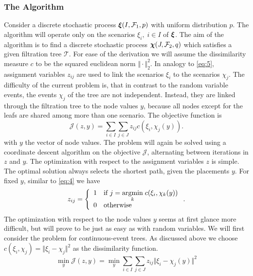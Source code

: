 \subsubsection{The Algorithm}
\label{sec:k-means-for-trees-alg}
Consider a discrete stochastic process $\boldsymbol\xi(I, \mathcal{F}_1, p)$ with uniform distribution $p$.
The algorithm will operate only on the scenarios $\xi_i,\; i\in I$ of $\boldsymbol\xi$.
The aim of the algorithm is to find a discrete stochastic process $\boldsymbol\chi(J, \mathcal{F}_2,q)$ which satisfies a given filtration tree $\mathcal{T}$.
For ease of the derivation we will assume the dissimilarity measure $c$ to be the squared euclidean norm $\Vert\cdot\Vert_2^2$.
In analogy to \eqref{eq:5}, assignment variables $z_{ij}$ are used to link the scenarios $\xi_i$ to the scenarios $\chi_j$.
The difficulty of the current problem is, that in contrast to the random variable events, the events $\chi_j$ of the tree are not independent.
Instead, they are linked through the filtration tree to the node values $y$, because all nodes except for the leafs are shared among more than one scenario.
The objective function is
\begin{equation}
  \label{eq:8}
  \mathcal{J}(z, y) = \sum_{i\in I}\sum_{j\in J}z_{ij}c(\xi_i, \chi_j(y)).
\end{equation}
with $y$ the vector of  node values.
The problem will again be solved using a coordinate descent algorithm on the objective $\mathcal{J}$, alternating between iterations in $z$ and $y$.
The optimization with respect to the assignment variables $z$ is simple.
The optimal solution always selects the shortest path, given the placements $y$.
For fixed $y$, similar to \eqref{eq:4} we have
\begin{equation}
  \label{eq:10}
  z_{ij} = \left\{\begin{array}{ll}1&\text{if }j=\underset{k}{\operatorname{argmin}}\; c(\xi_i,\chi_k(y))\\0&\text{otherwise} \end{array}\right. .
\end{equation}
The optimization with respect to the node values $y$ seems at first glance more difficult, but will prove to be just as easy as with random variables.
We will first consider the problem for continuous-event trees.
As discussed above we choose $c(\xi_i, \chi_j) = \Vert \xi_i-\chi_j\Vert^2$ as the dissimilarity function.
\begin{equation}
  \label{eq:11}
  \min\limits_y \mathcal{J}(z,y) = \min\limits_y \sum_{i\in I}\sum_{j\in J}z_{ij}\Vert \xi_i - \chi_j(y)\Vert^2
\end{equation}
